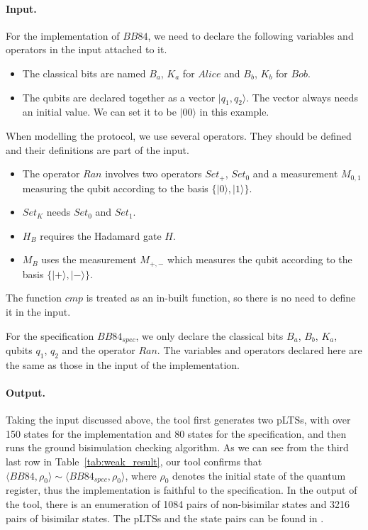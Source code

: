 \documentclass[runningheads]{llncs}
\begin{document}
\paragraph{Input.}
For the implementation of $BB84$, we need to declare the following variables and operators in the input attached to it.
\begin{itemize}
    \item The classical bits are named $B_a$, $K_a$ for $Alice$ and $B_b$, $K_b$ for $Bob$.
    \item The qubits are declared together as a vector $|q_1,q_2\rangle$. The vector always needs an initial value. We can set it to be $|00\rangle$ in this example.
\end{itemize}
When modelling the protocol, we use several operators. They should be defined and their definitions are part of the input. 
\begin{itemize}
    \item The operator $Ran$ involves two operators $Set_{+}$, $Set_{0}$ and a measurement $M_{0,1}$ measuring the qubit according to the basis $\{|0\rangle,|1\rangle\}$. 
    \item $Set_{K}$ needs $Set_{0}$ and $Set_{1}$.
    \item $H_{B}$ requires the Hadamard gate $H$.
    \item $M_{B}$ uses the measurement $M_{+,-}$ which measures the qubit according to the basis $\{|+\rangle,|-\rangle\}$. 
\end{itemize}
The function $cmp$ is treated as an in-built function, so there is no need to define it in the input.

For the specification $BB84_{spec}$, we only declare the classical bits $B_a$, $B_b$, $K_a$, qubits $q_1$, $q_2$ and the operator $Ran$. The variables and operators declared here are the same as those in the input of the implementation.

\paragraph{Output.}
Taking the input discussed above, the tool first generates two pLTSs, with over 150 states for the implementation and 80 states for the specification, and then runs the ground bisimulation checking algorithm. As we can see from the third last row in Table~\ref{tab:weak_result}, our tool confirms that $\langle BB84, \rho_0\rangle \sim \langle BB84_{spec}, \rho_0\rangle$, where $\rho_0$ denotes the initial state of the quantum register, thus the implementation is faithful to the specification. In the output of the tool, there is an enumeration of 1084 pairs of non-bisimilar states and 3216 pairs of bisimilar states. The pLTSs and the state pairs can be found in \cite{QBisim}.
\end{document}
